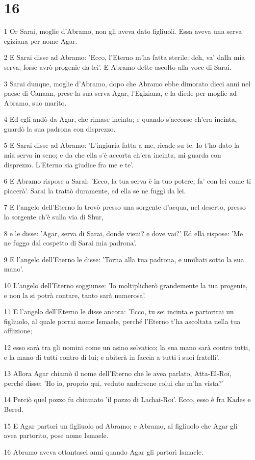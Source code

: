 \chapter{16}

\par 1 Or Sarai, moglie d'Abramo, non gli aveva dato figliuoli. Essa aveva una serva egiziana per nome Agar.
\par 2 E Sarai disse ad Abramo: 'Ecco, l'Eterno m'ha fatta sterile; deh, va' dalla mia serva; forse avrò progenie da lei'. E Abramo dette ascolto alla voce di Sarai.
\par 3 Sarai dunque, moglie d'Abramo, dopo che Abramo ebbe dimorato dieci anni nel paese di Canaan, prese la sua serva Agar, l'Egiziana, e la diede per moglie ad Abramo, suo marito.
\par 4 Ed egli andò da Agar, che rimase incinta; e quando s'accorse ch'era incinta, guardò la sua padrona con disprezzo.
\par 5 E Sarai disse ad Abramo: 'L'ingiuria fatta a me, ricade su te. Io t'ho dato la mia serva in seno; e da che ella s'è accorta ch'era incinta, mi guarda con disprezzo. L'Eterno sia giudice fra me e te'.
\par 6 E Abramo rispose a Sarai: 'Ecco, la tua serva è in tuo potere; fa' con lei come ti piacerà'. Sarai la trattò duramente, ed ella se ne fuggì da lei.
\par 7 E l'angelo dell'Eterno la trovò presso una sorgente d'acqua, nel deserto, presso la sorgente ch'è sulla via di Shur,
\par 8 e le disse: 'Agar, serva di Sarai, donde vieni? e dove vai?' Ed ella rispose: 'Me ne fuggo dal cospetto di Sarai mia padrona'.
\par 9 E l'angelo dell'Eterno le disse: 'Torna alla tua padrona, e umiliati sotto la sua mano'.
\par 10 L'angelo dell'Eterno soggiunse: 'Io moltiplicherò grandemente la tua progenie, e non la si potrà contare, tanto sarà numerosa'.
\par 11 E l'angelo dell'Eterno le disse ancora: 'Ecco, tu sei incinta e partorirai un figliuolo, al quale porrai nome Ismaele, perché l'Eterno t'ha ascoltata nella tua afflizione;
\par 12 esso sarà tra gli uomini come un asino selvatico; la sua mano sarà contro tutti, e la mano di tutti contro di lui; e abiterà in faccia a tutti i suoi fratelli'.
\par 13 Allora Agar chiamò il nome dell'Eterno che le avea parlato, Atta-El-Roï, perché disse: 'Ho io, proprio qui, veduto andarsene colui che m'ha vista?'
\par 14 Perciò quel pozzo fu chiamato 'il pozzo di Lachai-Roï'. Ecco, esso è fra Kades e Bered.
\par 15 E Agar partorì un figliuolo ad Abramo; e Abramo, al figliuolo che Agar gli avea partorito, pose nome Ismaele.
\par 16 Abramo aveva ottantasei anni quando Agar gli partorì Ismaele.

